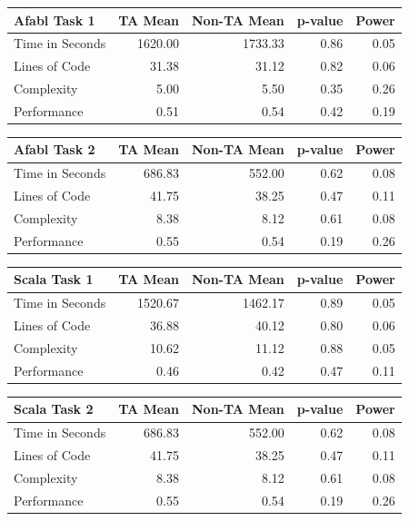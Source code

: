 \begin{center}
\begin{table}[h]

\begin{center}
\begin{tabular}{|l|r|r|r|r|}\hline
Afabl Task 1 & TA Mean & Non-TA Mean & p-value & Power\\\hline
Time in Seconds & 1620.00 & 1733.33 & 0.86 & 0.05\\
Lines of Code & 31.38 & 31.12 & 0.82 & 0.06\\
Complexity & 5.00 & 5.50 & 0.35 & 0.26\\
Performance & 0.51 & 0.54 & 0.42 & 0.19\\
\hline
\end{tabular}


\begin{tabular}{|l|r|r|r|r|}\hline
Afabl Task 2 & TA Mean & Non-TA Mean & p-value & Power\\\hline
Time in Seconds & 686.83 & 552.00 & 0.62 & 0.08\\
Lines of Code & 41.75 & 38.25 & 0.47 & 0.11\\
Complexity & 8.38 & 8.12 & 0.61 & 0.08\\
Performance & 0.55 & 0.54 & 0.19 & 0.26\\
\hline
\end{tabular}


\begin{tabular}{|l|r|r|r|r|}\hline
Scala Task 1 & TA Mean & Non-TA Mean & p-value & Power\\\hline
Time in Seconds & 1520.67 & 1462.17 & 0.89 & 0.05\\
Lines of Code & 36.88 & 40.12 & 0.80 & 0.06\\
Complexity & 10.62 & 11.12 & 0.88 & 0.05\\
Performance & 0.46 & 0.42 & 0.47 & 0.11\\
\hline
\end{tabular}


\begin{tabular}{|l|r|r|r|r|}\hline
Scala Task 2 & TA Mean & Non-TA Mean & p-value & Power\\\hline
Time in Seconds & 686.83 & 552.00 & 0.62 & 0.08\\
Lines of Code & 41.75 & 38.25 & 0.47 & 0.11\\
Complexity & 8.38 & 8.12 & 0.61 & 0.08\\
Performance & 0.55 & 0.54 & 0.19 & 0.26\\
\hline
\end{tabular}


\end{center}
\end{table}
\end{center}
